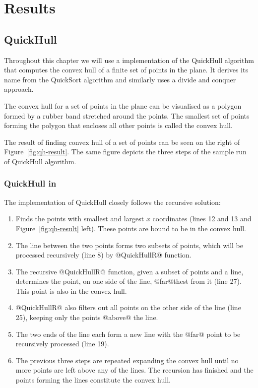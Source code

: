 \documentclass[preamble.tex]{subfiles}
\begin{document}
\clearpage

\chapter{Results}
\label{ch:results}


\section{QuickHull}
\label{sec:quickhull}

Throughout this chapter we will use a  implementation of the QuickHull algorithm that computes the convex hull of a finite set of points in the plane. It derives its name from the QuickSort algorithm and similarly uses a divide and conquer approach.

The convex hull for a set of points in the plane can be visualised as a polygon formed by a rubber band stretched around the points. The smallest set of points forming the polygon that encloses all other points is called the convex hull.

The result of finding convex hull of a set of points can be seen on the right of Figure~\ref{fig:qh-result}. The same figure depicts the three steps of the sample run of QuickHull algorithm.


\subsection{QuickHull in \DPH}

The \DPH implementation of QuickHull closely follows the recursive solution:
\begin{enumerate}
  \item Finds the points with smallest and largest $x$ coordinates (lines 12 and 13 and Figure~\ref{fig:qh-result} left). These points are bound to be in the convex hull.

  \item The line between the two points forms two subsets of points, which will be processed recursively (line 8) by @QuickHullR@ function.

  \item The recursive @QuickHullR@ function, given a subset of points and a line, determines the point, on one side of the line, @far@thest from it (line 27). This point is also in the convex hull.

  \item @QuickHullR@ also filters out all points on the other side of the line (line 25), keeping only the points @above@ the line.

  \item The two ends of the line each form a new line with the @far@ point to be recursively processed (line 19).

  \item The previous three steps are repeated expanding the convex hull until no more points are left above any of the lines. The recursion has finished and the points forming the lines constitute the convex hull.
\end{enumerate}
\end{document}
